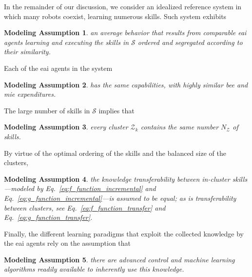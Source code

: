 \documentclass[12pt]{article}
\newtheorem{assumption}{Modeling Assumption}
\begin{document}
In the remainder of our discussion, we consider an idealized reference system in which many robots coexist, learning numerous skills. Such system exhibits
\begin{tcolorbox}
	\begin{assumption}\label{assumption:average_behavior}
		an average behavior that results from comparable \ac{eai} agents learning and executing the skills in $\mathcal{S}$ ordered and segregated according to their similarity.
	\end{assumption}
\end{tcolorbox}
\noindent Each of the \ac{eai} agents in the system
\begin{tcolorbox}
	\begin{assumption}\label{assumption:agent_similarity}
		has the same capabilities, with highly similar \ac{bee} and \ac{mie} expenditures.
	\end{assumption}
\end{tcolorbox}
\noindent The large number of skills in $\mathcal{S}$ implies that
\begin{tcolorbox}
	\begin{assumption}\label{assumption:cluster_size}
		every cluster $\mathcal{Z}_{k}$ contains the same number $N_{\mathcal{Z}} $ of skills.
	\end{assumption}
\end{tcolorbox}
\noindent By virtue of the optimal ordering of the skills and the balanced size of the clusters,
\begin{tcolorbox}
	\begin{assumption}\label{assumption:cluster_transferability}
		the knowledge transferability between in-cluster skills---modeled by Eq.~\eqref{eq:f_function_incremental} and Eq.~\eqref{eq:g_function_incremental}---is assumed to be equal; as is transferability between clusters, see Eq.~\eqref{eq:f_function_transfer} and Eq.~\eqref{eq:g_function_transfer}.
	\end{assumption}
\end{tcolorbox}
\noindent Finally, the different learning paradigms that exploit the collected knowledge by the \ac{eai} agents rely on the assumption that
\begin{tcolorbox}
	\begin{assumption}\label{assumption:enabling_agorithms}
		there are advanced control and machine learning algorithms readily available to inherently use this knowledge.
	\end{assumption}
\end{tcolorbox}
\end{document}
